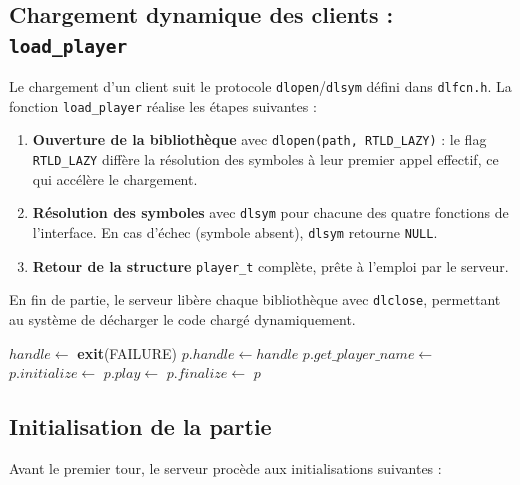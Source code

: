 \documentclass[12pt,a4paper]{article}
\begin{document}
\subsection{Chargement dynamique des clients : \texttt{load\_player}}

Le chargement d'un client suit le protocole \texttt{dlopen}/\texttt{dlsym}
défini dans \texttt{dlfcn.h}. La fonction \texttt{load\_player} réalise les
étapes suivantes :

\begin{enumerate}
    \item \textbf{Ouverture de la bibliothèque} avec \texttt{dlopen(path, RTLD\_LAZY)} :
    le flag \texttt{RTLD\_LAZY} diffère la résolution des symboles à leur premier
    appel effectif, ce qui accélère le chargement.
    \item \textbf{Résolution des symboles} avec \texttt{dlsym} pour chacune des
    quatre fonctions de l'interface. En cas d'échec (symbole absent), \texttt{dlsym}
    retourne \texttt{NULL}.
    \item \textbf{Retour de la structure} \texttt{player\_t} complète, prête à
    l'emploi par le serveur.
\end{enumerate}

En fin de partie, le serveur libère chaque bibliothèque avec \texttt{dlclose},
permettant au système de décharger le code chargé dynamiquement.

\begin{algorithm}
\caption{Chargement d'un client dynamique}
\begin{algorithmic}[1]
    \State $handle \gets$ 
     \textbf{exit}(FAILURE) \EndIf
    \State $p.handle \gets handle$
    \State $p.get\_player\_name \gets$ 
    \State $p.initialize \gets$ 
    \State $p.play \gets$ 
    \State $p.finalize \gets$ 
    \Return $p$
\EndFunction
\end{algorithmic}
\end{algorithm}

\subsection{Initialisation de la partie}

Avant le premier tour, le serveur procède aux initialisations suivantes :
\end{document}
